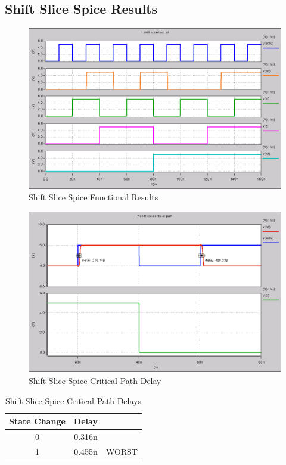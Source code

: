     \newpage
    \subsection{Shift Slice Spice Results}
        
        \begin{figure}[H]
            \centering
            \includegraphics[width=0.75\linewidth]{../../spice/shift_slice_all.png}
            \caption{Shift Slice Spice Functional Results}
        \end{figure}
        \begin{figure}[H]
            \centering
            \includegraphics[width=0.75\linewidth]{../../spice/shift_slice_crit_path.png}
            \caption{Shift Slice Spice Critical Path Delay}
        \end{figure}
        \begin{table}[H]
            \centering
            \begin{tabular}{crc}
                \toprule
                \textbf{State Change} & \textbf{Delay} & \\
                \midrule
                0 & 0.316n & \\
                1 & 0.455n & WORST \\
                \bottomrule
            \end{tabular}
            \caption{Shift Slice Spice Critical Path Delays}
        \end{table}


